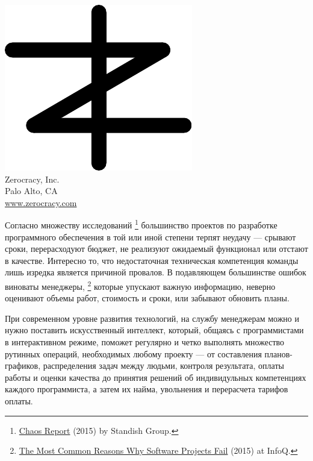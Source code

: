 \documentclass{article}
\begin{document}

\pagecolor{white}
\newcommand\slide[1]{%
  \pagebreak\topskip0pt\vspace*{\fill}%
  \begin{center}\huge%
  #1
  \end{center}%
  \vspace*{\fill}%
}

\slide{\includegraphics[scale=1]{../images/zerocracy-logo.pdf}\\
Zerocracy, Inc.\\[1em]
\large Palo Alto, CA\\
\large \href{https://www.zerocracy.com}{www.zerocracy.com}}

\slide{Согласно множеству исследований%
\footnote{%
  \href{https://www.projectsmart.co.uk/white-papers/chaos-report.pdf}{Chaos Report} (2015) by Standish Group.
}
большинство проектов по разработке программного обеспечения
в той или иной степени терпят неудачу --- срывают сроки, перерасходуют бюджет, не реализуют
ожидаемый функционал или отстают в качестве. Интересно то, что недостаточная техническая компетенция команды лишь изредка является
причиной провалов. В подавляющем большинстве ошибок виноваты менеджеры,%
\footnote{%
  \href{https://www.infoq.com/articles/software-failure-reasons}{The Most Common Reasons Why Software Projects Fail} (2015) at InfoQ.
}
которые упускают
важную информацию, неверно оценивают объемы работ, стоимость и сроки, или забывают обновить
планы.}

\slide{При современном уровне развития технологий, на службу менеджерам можно и нужно поставить
искусственный интеллект, который, общаясь с программистами в интерактивном режиме,
поможет регулярно и четко выполнять множество рутинных операций, необходимых
любому проекту --- от составления планов-графиков, распределения задач между людьми,
контроля результата, оплаты работы и оценки качества до принятия решений
об индивидульных компетенциях каждого программиста, а затем их найма, увольнения
и перерасчета тарифов оплаты.}
\end{document}
